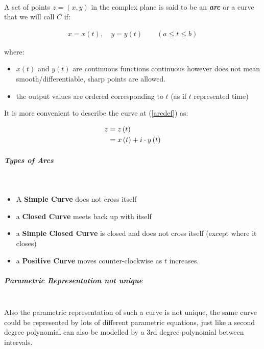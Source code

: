\documentclass[class=article, crop=false]{standalone}
\begin{document}
~\\
A set of points \(z = \left( x,y \right)\) in the complex plane is said
to be an \textbf{\emph{arc}} or a curve that we will call \(C\) if:

\[\begin{aligned}
 x =  x\left( t \right), \quad y =  y\left( t \right) \qquad \left( a \leq t \leq b \right)
  \label{arcdef}\end{aligned}\]

where:

\begin{itemize}
\item
  \(x\left( t \right)\) and \(y\left( t \right)\) are continuous
  functions continuous however does not mean smooth/differentiable,
  sharp points are allowed.
\item
  the output values are ordered corresponding to \(t\) (as if \(t\)
  represented time)
\end{itemize}

It is more convenient to describe the curve at
(\protect\hyperlink{arcdef}{{[}arcdef{]}}) as:

\[\begin{aligned}
  z &= z\left( t \right)  \label{arccompdef} \\
  &= x\left( t \right) + i\cdot y\left( t \right) \notag\end{aligned}\]

\hypertarget{types-of-arcs}{%
\subparagraph{Types of Arcs}\label{types-of-arcs}}

~\\

\begin{itemize}
\item
  A \textbf{Simple Curve} does not cross itself
\item
  a \textbf{Closed Curve} meets back up with itself
\item
  a \textbf{Simple Closed Curve} is closed and does not cross itself
  (except where it closes)
\item
  a \textbf{Positive Curve} moves counter-clockwise as \(t\) increases.
\end{itemize}

\hypertarget{parametric-representation-not-unique}{%
\subparagraph{Parametric Representation not
unique}\label{parametric-representation-not-unique}}

~\\
Also the parametric representation of such a curve is not unique, the
same curve could be represented by lots of different parametric
equations, just like a second degree polynomial can also be modelled by
a 3rd degree polynomial between intervals.
\end{document}
